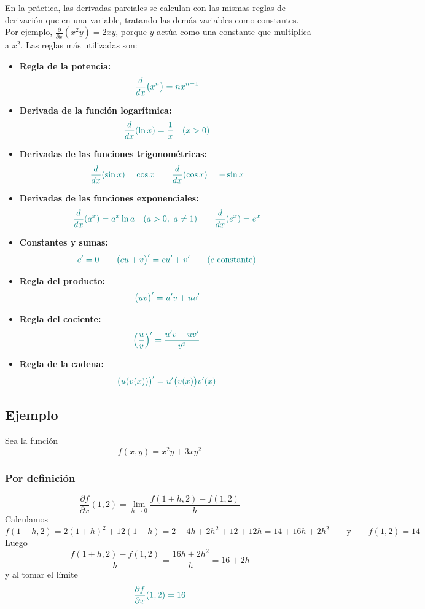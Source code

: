 \documentclass{article}
\begin{document}
En la práctica, las derivadas parciales se calculan con las mismas reglas de derivación que en una variable, tratando las demás variables como constantes. Por ejemplo, \(\frac{\partial}{\partial x}(x^{2}y)=2xy\), porque \(y\) actúa como una constante que multiplica a \(x^{2}\). Las reglas más utilizadas son:

\begin{itemize}
  \item \textbf{Regla de la potencia:}
    \[
    \color{teal}
    \frac{d}{dx}\bigl(x^{n}\bigr)
    =nx^{n-1}
    \]
  \item \textbf{Derivada de la función logarítmica:}
    \[
    \color{teal}
\frac{d}{dx}(\ln x)=\frac{1}{x}\quad (x>0)
    \]
  \item \textbf{Derivadas de las funciones trigonométricas:}
    \[
    \color{teal}
      \frac{d}{dx}(\sin x)=\cos x
      \qquad
      \frac{d}{dx}(\cos x)=-\sin x
    \]
  \item \textbf{Derivadas de las funciones exponenciales:}
    \[
    \color{teal}
     \frac{d}{dx}(a^{x})=a^{x}\ln a\quad (a>0,\ a\neq 1)
     \qquad
     \frac{d}{dx}(e^{x})=e^{x}
    \]
  \item \textbf{Constantes y sumas:}
    \[
    \color{teal}
    c'=0
    \qquad
    \bigl(cu+v\bigr)'=cu'+v'
    \qquad(c\text{ constante})
    \]
  \item \textbf{Regla del producto:}
    \[
    \color{teal}
    \bigl(uv\bigr)'=u'v+uv'
    \]
  \item \textbf{Regla del cociente:}
    \[
    \color{teal}
    \Bigl(\frac{u}{v}\Bigr)'=\frac{u'v-uv'}{v^{2}}
    \]
  \item \textbf{Regla de la cadena:}
    \[
    \color{teal}
    \bigl(u(v(x))\bigr)'=u'\bigl(v(x)\bigr)v'(x)
    \]
\end{itemize}



\subsection*{Ejemplo}

Sea la función
\[
f(x,y)=x^{2}y + 3xy^{2}
\]

\subsubsection*{Por definición}
\[
\frac{\partial f}{\partial x}(1,2)
=
\lim_{h\to0}
\frac{f(1+h,2)-f(1,2)}{h}
\]
Calculamos
\[
f(1+h,2)
=2(1+h)^{2} + 12(1+h)
=2 + 4h + 2h^{2} + 12 + 12h
=14 + 16h + 2h^{2}
\qquad\text{y}\qquad
f(1,2)=14
\]
Luego
\[
\frac{f(1+h,2)-f(1,2)}{h}
=\frac{16h+2h^{2}}{h}
=16+2h
\]
y al tomar el límite
\[
\color{teal}
\frac{\partial f}{\partial x}(1,2)=16
\]
\end{document}
